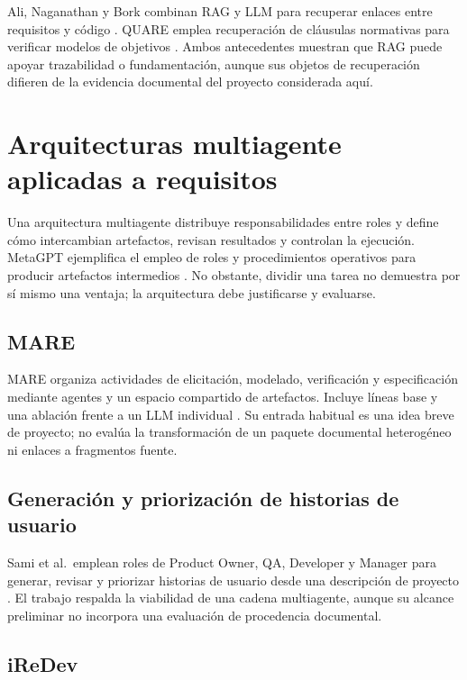 Ali, Naganathan y Bork combinan RAG y LLM para recuperar enlaces entre requisitos y código \cite{ali2024}. QUARE emplea recuperación de cláusulas normativas para verificar modelos de objetivos \cite{quare2026}. Ambos antecedentes muestran que RAG puede apoyar trazabilidad o fundamentación, aunque sus objetos de recuperación difieren de la evidencia documental del proyecto considerada aquí.

\section{Arquitecturas multiagente aplicadas a requisitos}

Una arquitectura multiagente distribuye responsabilidades entre roles y define cómo intercambian artefactos, revisan resultados y controlan la ejecución. MetaGPT ejemplifica el empleo de roles y procedimientos operativos para producir artefactos intermedios \cite{metagpt2024}. No obstante, dividir una tarea no demuestra por sí mismo una ventaja; la arquitectura debe justificarse y evaluarse.

\subsection{MARE}

MARE organiza actividades de elicitación, modelado, verificación y especificación mediante agentes y un espacio compartido de artefactos. Incluye líneas base y una ablación frente a un LLM individual \cite{mare2024}. Su entrada habitual es una idea breve de proyecto; no evalúa la transformación de un paquete documental heterogéneo ni enlaces a fragmentos fuente.

\subsection{Generación y priorización de historias de usuario}

Sami et al.\ emplean roles de Product Owner, QA, Developer y Manager para generar, revisar y priorizar historias de usuario desde una descripción de proyecto \cite{sami2024}. El trabajo respalda la viabilidad de una cadena multiagente, aunque su alcance preliminar no incorpora una evaluación de procedencia documental.

\subsection{iReDev}

